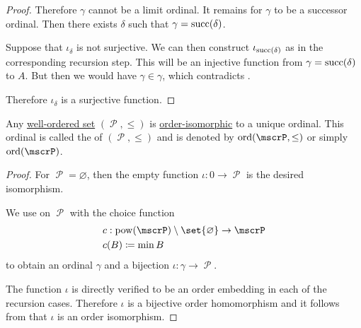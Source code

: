 \begin{proof}
  Therefore \( \gamma \) cannot be a limit ordinal. It remains for \( \gamma \) to be a successor ordinal. Then there exists \( \delta \) such that \( \gamma = \operatorname{succ}(\delta) \).

  Suppose that \( \iota_\delta \) is not surjective. We can then construct \( \iota_{\operatorname{succ}(\delta)} \) as in the corresponding recursion step. This will be an injective function from \( \gamma = \operatorname{succ}(\delta) \) to \( A \). But then we would have \( \gamma \in \gamma \), which contradicts .

  Therefore \( \iota_\delta \) is a surjective function.
\end{proof}

\begin{proposition}\label{thm:order_type_existence}
  Any \hyperref[def:well_ordered_set]{well-ordered set} \( (\mscrP, \leq) \) is \hyperref[def:partially_ordered_set/homomorphism]{order-isomorphic} to a unique ordinal. This ordinal is called the  of \( (\mscrP, \leq) \) and is denoted by \( \ord(\mscrP, \leq) \) or simply \( \ord(\mscrP) \).
\end{proposition}
\begin{proof}
  For \( \mscrP = \varnothing \), then the empty function \( \iota: 0 \to \mscrP \) is the desired isomorphism.

  We use  on \( \mscrP \) with the choice function
  \begin{equation*}
    \begin{aligned}
      &c: \pow(\mscrP) \setminus \set{ \varnothing } \to \mscrP \\
      &c(B) \coloneqq \min B
    \end{aligned}
  \end{equation*}
  to obtain an ordinal \( \gamma \) and a bijection \( \iota: \gamma \to \mscrP \).

  The function \( \iota \) is directly verified to be an order embedding in each of the recursion cases. Therefore \( \iota \) is a bijective order homomorphism and it follows from  that \( \iota \) is an order isomorphism.
\end{proof}

